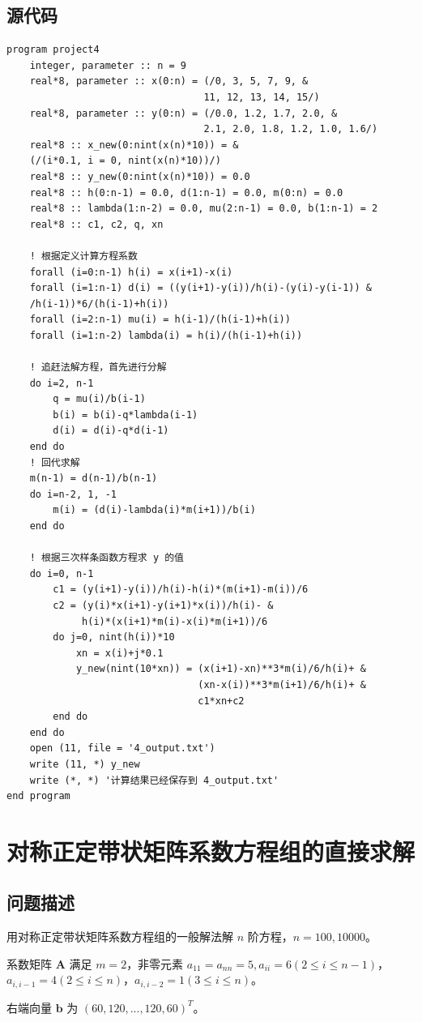 \documentclass{ctexart}
\begin{document}
\subsection{源代码}
\begin{lstlisting}
program project4
	integer, parameter :: n = 9
	real*8, parameter :: x(0:n) = (/0, 3, 5, 7, 9, &
		                          11, 12, 13, 14, 15/)
	real*8, parameter :: y(0:n) = (/0.0, 1.2, 1.7, 2.0, &
		                          2.1, 2.0, 1.8, 1.2, 1.0, 1.6/)
	real*8 :: x_new(0:nint(x(n)*10)) = &
	(/(i*0.1, i = 0, nint(x(n)*10))/)
	real*8 :: y_new(0:nint(x(n)*10)) = 0.0
	real*8 :: h(0:n-1) = 0.0, d(1:n-1) = 0.0, m(0:n) = 0.0
	real*8 :: lambda(1:n-2) = 0.0, mu(2:n-1) = 0.0, b(1:n-1) = 2
	real*8 :: c1, c2, q, xn

	! 根据定义计算方程系数
	forall (i=0:n-1) h(i) = x(i+1)-x(i)
	forall (i=1:n-1) d(i) = ((y(i+1)-y(i))/h(i)-(y(i)-y(i-1)) & 
	/h(i-1))*6/(h(i-1)+h(i))
	forall (i=2:n-1) mu(i) = h(i-1)/(h(i-1)+h(i))
	forall (i=1:n-2) lambda(i) = h(i)/(h(i-1)+h(i))

	! 追赶法解方程，首先进行分解
	do i=2, n-1
		q = mu(i)/b(i-1)
		b(i) = b(i)-q*lambda(i-1)
		d(i) = d(i)-q*d(i-1)
	end do
	! 回代求解
	m(n-1) = d(n-1)/b(n-1)
	do i=n-2, 1, -1
		m(i) = (d(i)-lambda(i)*m(i+1))/b(i)
	end do

	! 根据三次样条函数方程求 y 的值
	do i=0, n-1
		c1 = (y(i+1)-y(i))/h(i)-h(i)*(m(i+1)-m(i))/6
		c2 = (y(i)*x(i+1)-y(i+1)*x(i))/h(i)- & 
		     h(i)*(x(i+1)*m(i)-x(i)*m(i+1))/6
		do j=0, nint(h(i))*10
			xn = x(i)+j*0.1
			y_new(nint(10*xn)) = (x(i+1)-xn)**3*m(i)/6/h(i)+ &
			                     (xn-x(i))**3*m(i+1)/6/h(i)+ &
			                     c1*xn+c2
		end do
	end do
	open (11, file = '4_output.txt')
	write (11, *) y_new
	write (*, *) '计算结果已经保存到 4_output.txt'
end program
\end{lstlisting}
\newpage
\section{对称正定带状矩阵系数方程组的直接求解}
\subsection{问题描述}
用对称正定带状矩阵系数方程组的一般解法解 $n$ 阶方程，$n = 100, 10000$。

系数矩阵 $\mathbf A$ 满足 $m=2$，非零元素 $a_{11}=a_{nn}=5,a_{ii}=6(2\le i\le n-1)$，$a_{i,i-1}=4(2\le i\le n)$，$a_{i,i-2}=1(3\le i\le n)$。

右端向量 $\mathbf b$ 为 $(60, 120, ..., 120, 60)^T$。
\end{document}
